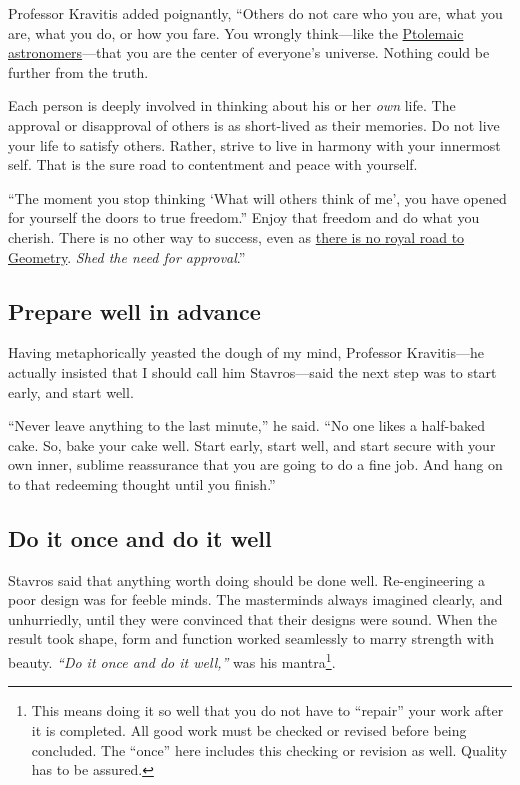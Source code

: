 \documentclass[
  a4paper,
]{article}
\begin{document}
Professor Kravitis added poignantly, ``Others do not care who you are,
what you are, what you do, or how you fare. You wrongly think---like the
\href{https://www.princeton.edu/~hos/mike/texts/ptolemy/ptolemy.html}{Ptolemaic
astronomers}---that you are the center of everyone's universe. Nothing
could be further from the truth.

Each person is deeply involved in thinking about his or her \emph{own}
life. The approval or disapproval of others is as short-lived as their
memories. Do not live your life to satisfy others. Rather, strive to
live in harmony with your innermost self. That is the sure road to
contentment and peace with yourself.

``The moment you stop thinking `What will others think of me', you have
opened for yourself the doors to true freedom.'' Enjoy that freedom and
do what you cherish. There is no other way to success, even as
\href{https://idioms.thefreedictionary.com/royal+road+to}{there is no
royal road to Geometry}. \emph{Shed the need for approval}.''

\hypertarget{prepare-well-in-advance}{%
\subsection{Prepare well in advance}\label{prepare-well-in-advance}}

Having metaphorically yeasted the dough of my mind, Professor
Kravitis---he actually insisted that I should call him Stavros---said
the next step was to start early, and start well.

``Never leave anything to the last minute,'' he said. ``No one likes a
half-baked cake. So, bake your cake well. Start early, start well, and
start secure with your own inner, sublime reassurance that you are going
to do a fine job. And hang on to that redeeming thought until you
finish.''

\hypertarget{do-it-once-and-do-it-well}{%
\subsection{Do it once and do it well}\label{do-it-once-and-do-it-well}}

Stavros said that anything worth doing should be done well.
Re-engineering a poor design was for feeble minds. The masterminds
always imagined clearly, and unhurriedly, until they were convinced that
their designs were sound. When the result took shape, form and function
worked seamlessly to marry strength with beauty. \emph{``Do it once and
do it well,''} was his mantra\footnote{This means doing it so well that
  you do not have to ``repair'' your work after it is completed. All
  good work must be checked or revised before being concluded. The
  ``once'' here includes this checking or revision as well. Quality has
  to be assured.  \normalfont}.
\end{document}
